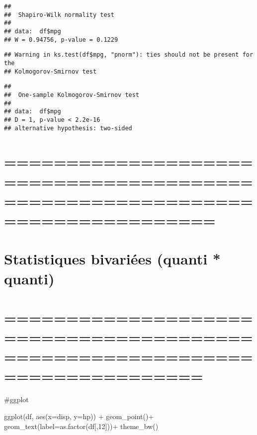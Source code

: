 \documentclass[
]{article}
\newenvironment{Shaded}{\begin{snugshade}}{\end{snugshade}}
\newcommand{\AttributeTok}[1]{\textcolor[rgb]{0.77,0.63,0.00}{#1}}
\newcommand{\DecValTok}[1]{\textcolor[rgb]{0.00,0.00,0.81}{#1}}
\newcommand{\FunctionTok}[1]{\textcolor[rgb]{0.00,0.00,0.00}{#1}}
\newcommand{\NormalTok}[1]{#1}
\newcommand{\SpecialCharTok}[1]{\textcolor[rgb]{0.00,0.00,0.00}{#1}}
\newcommand{\StringTok}[1]{\textcolor[rgb]{0.31,0.60,0.02}{#1}}
\begin{document}
\begin{verbatim}
## 
##  Shapiro-Wilk normality test
## 
## data:  df$mpg
## W = 0.94756, p-value = 0.1229
\end{verbatim}

\begin{Shaded}
\end{Shaded}

\begin{verbatim}
## Warning in ks.test(df$mpg, "pnorm"): ties should not be present for the
## Kolmogorov-Smirnov test
\end{verbatim}

\begin{verbatim}
## 
##  One-sample Kolmogorov-Smirnov test
## 
## data:  df$mpg
## D = 1, p-value < 2.2e-16
## alternative hypothesis: two-sided
\end{verbatim}

\hypertarget{section-10}{%
\section{=============================================================================}\label{section-10}}

\hypertarget{statistiques-bivariuxe9es-quanti-quanti}{%
\section{Statistiques bivariées (quanti *
quanti)}\label{statistiques-bivariuxe9es-quanti-quanti}}

\hypertarget{section-11}{%
\section{============================================================================}\label{section-11}}

\#ggplot

\begin{Shaded}
\begin{Highlighting}[]
\FunctionTok{ggplot}\NormalTok{(df, }\FunctionTok{aes}\NormalTok{(}\AttributeTok{x=}\NormalTok{disp, }\AttributeTok{y=}\NormalTok{hp)) }\SpecialCharTok{+}
  \FunctionTok{geom\_point}\NormalTok{()}\SpecialCharTok{+}
  \FunctionTok{geom\_text}\NormalTok{(}\AttributeTok{label=}\FunctionTok{as.factor}\NormalTok{(df[,}\DecValTok{12}\NormalTok{]))}\SpecialCharTok{+}
   \FunctionTok{theme\_bw}\NormalTok{()}
\end{Highlighting}
\end{Shaded}
\end{document}
